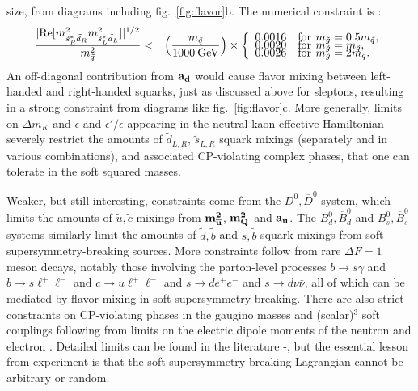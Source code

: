 \documentclass[12pt]{article}
\def\beq{\begin{eqnarray}}
\def\eeq{\end{eqnarray}}
\def\sbar{\overline}
\def\stilde{\widetilde}
\begin{document}
size, from diagrams including fig.~\ref{fig:flavor}b. 
The numerical constraint is \cite{Ciuchini:1998ix}: 
\beq
\frac{|{\rm Re}[m^2_{\tilde s_R^* \tilde d_R}
m^2_{\tilde s_L^* \tilde d_L}]|^{1/2}}{
m^2_{\tilde q}}
&<&
\left ( \frac{m_{\tilde q}}{1000 \>{\rm GeV}} \right )
\times
\left \{ 
\begin{array}{ll}
0.0016 & {\rm for}\>\, m_{\tilde g} = 0.5 m_{\tilde q},
\\[-5pt]
0.0020 & {\rm for}\>\, m_{\tilde g} = m_{\tilde q},
\\[-5pt]
0.0026 & {\rm for}\>\, m_{\tilde g} = 2 m_{\tilde q}.
\end{array}
\right.
\label{eq:striking}
\eeq
An off-diagonal contribution from ${\bf a_d}$ would cause flavor mixing 
between left-handed and right-handed squarks, just as discussed above for 
sleptons, resulting in a strong constraint from diagrams like 
fig.~\ref{fig:flavor}c. More generally, limits on $\Delta m_K$ and 
$\epsilon$ and $\epsilon'/\epsilon$ appearing in the neutral kaon 
effective Hamiltonian severely restrict the amounts of $\stilde 
d_{L,R},\,\stilde s_{L,R}$ squark mixings (separately and in various 
combinations), and associated CP-violating complex phases, that one can 
tolerate in the soft squared masses.

Weaker, but still interesting, constraints come from the $D^0, \overline 
D^0$ system, which limits the amounts of $\stilde u,\stilde c$ mixings 
from ${\bf m_{\sbar u}^2}$, ${\bf m_Q^2}$ and ${\bf a_u}$. The $B_d^0, 
\overline B_d^0$ and $B_s^0, \overline B_s^0$ systems similarly limit the 
amounts of $\stilde d,\stilde b$ and $\stilde s,\stilde b$ squark mixings 
from soft supersymmetry-breaking sources.  More constraints follow from 
rare $\Delta F=1$ meson decays, notably those involving the parton-level 
processes $b\rightarrow s\gamma$ and $b \rightarrow s \ell^+ \ell^-$ and 
$c \rightarrow u \ell^+ \ell^-$ and $s \rightarrow d e^+ e^-$ and $s 
\rightarrow d \nu \bar \nu$, all of which can be mediated by flavor mixing 
in soft supersymmetry breaking. There are also strict constraints on 
CP-violating phases in the gaugino masses and (scalar)$^3$ soft couplings 
following from limits on the electric dipole moments of the neutron and 
electron \cite{demon}. Detailed limits can be found in the literature
\cite{FCNCs}-\cite{Ciuchini:2002uv}, 
but the essential lesson from experiment is that the soft 
supersymmetry-breaking Lagrangian cannot be arbitrary or random.
\end{document}

